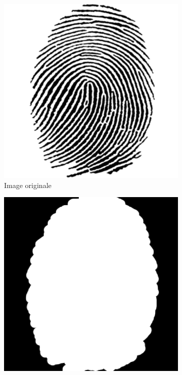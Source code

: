 \begin{figure}
    \centering
    \begin{subfigure}[b]{.25\textwidth}
        \centering
        \includegraphics[width=\textwidth]{contenu/resources/images/fingerprint}
        \caption{Image originale}
    \end{subfigure}
    \hfill
    \begin{subfigure}[b]{.25\textwidth}
        \centering
        \includegraphics[width=\textwidth]{contenu/resources/images/pc_layer_0_1}

\end{subfigure}
\end{figure}
